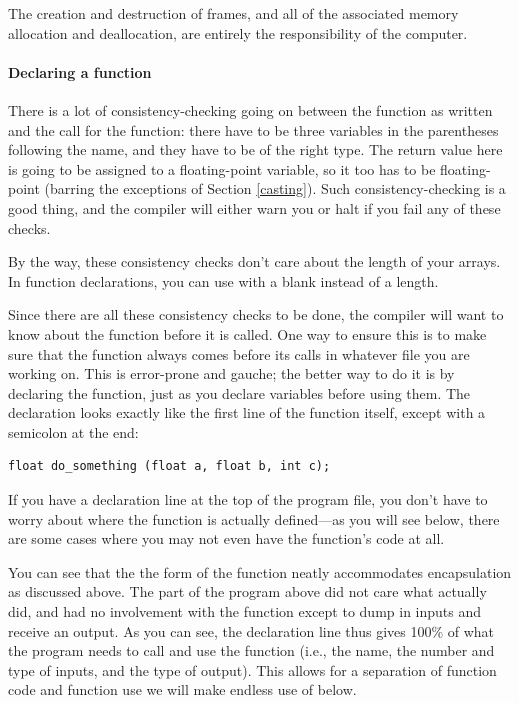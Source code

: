 \documentclass[12pt]{article}
\begin{document}
The creation and destruction of frames, and all of the associated
memory allocation and deallocation, are entirely the responsibility of
the computer.   

\paragraph{Declaring a function} 
There is a lot of consistency-checking going on between the function as
written and the call for the function: there have to be three variables
in the parentheses following the name, and they have to be of the right
type. The return value here is going to be assigned to a floating-point
variable, so it too has to be floating-point (barring the exceptions of
Section \ref{casting}). Such consistency-checking is a good thing, and
the compiler will either warn you or halt if you fail any of these checks.

By the way, these consistency checks don't care about the length of
your arrays. In function declarations, you can use 
with a blank instead of a length.  

Since there are all these consistency
checks to be done, the compiler will want to know about the function
before it is called. One way to ensure this is to make sure that
the function always comes before its calls in whatever file you are
working on. This is error-prone and gauche; the better way to do it is
by declaring the function, just as you declare variables before using
them. The declaration looks exactly like the first line of the function
itself, except with a semicolon at the end:

\begin{lstlisting}
float do_something (float a, float b, int c);
\end{lstlisting}

If you have a declaration line at the top of the program file, you don't
have to worry about where the function is actually defined---as
you will see below, there are some cases where you may not even have the
function's code at all. 

You can see that the the form of the function neatly accommodates
encapsulation as discussed above.  
The  part of the program above did not care what
 actually did, and had no involvement with the
function except to dump in inputs and receive an output. As you can see,
the declaration line thus gives 100\% of what the program needs to call
and use the function (i.e., the name, the number and type of inputs,
and the type of output). This allows for a separation of function code
and function use we will make endless use of below.
\end{document}
